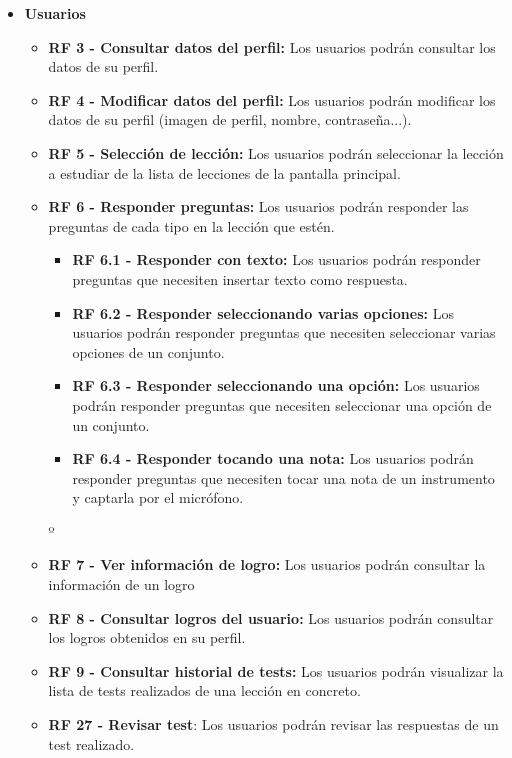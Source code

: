 \begin{itemize}
\begin{itemize}
          \end{itemize}
    \item \textbf{Usuarios}
          \begin{itemize}
              \item \textbf{RF 3 - Consultar datos del perfil: }Los usuarios podrán consultar los datos de su perfil.
              \item \textbf{RF 4 - Modificar datos del perfil: }Los usuarios podrán modificar los datos de su perfil (imagen de perfil, nombre, contraseña...).
              \item \textbf{RF 5 - Selección de lección: }Los usuarios podrán seleccionar la lección a estudiar de la lista de lecciones de la pantalla principal.
              \item \textbf{RF 6 - Responder preguntas: }Los usuarios podrán responder las preguntas de cada tipo en la lección que estén.
                    \begin{itemize}
                        \item \textbf{RF 6.1 - Responder con texto: }Los usuarios podrán responder preguntas que necesiten insertar texto como respuesta.
                        \item \textbf{RF 6.2 - Responder seleccionando varias opciones: }Los usuarios podrán responder preguntas que necesiten seleccionar varias opciones de un conjunto.
                        \item \textbf{RF 6.3 - Responder seleccionando una opción: }Los usuarios podrán responder preguntas que necesiten seleccionar una opción de un conjunto.
                        \item \textbf{RF 6.4 - Responder tocando una nota: }Los usuarios podrán responder preguntas que necesiten tocar una nota de un instrumento y captarla por el micrófono.
                    \end{itemize}º
              \item \textbf{RF 7 - Ver información de logro: }Los usuarios podrán consultar la información de un logro
              \item \textbf{RF 8 - Consultar logros del usuario: } Los usuarios podrán consultar los logros obtenidos en su perfil.
              \item \textbf{RF 9 - Consultar historial de tests: } Los usuarios podrán visualizar la lista de tests realizados de una lección en concreto.
              \item \textbf{RF 27 - Revisar test}: Los usuarios podrán revisar las respuestas de un test realizado. 

\end{itemize}
\end{itemize}
